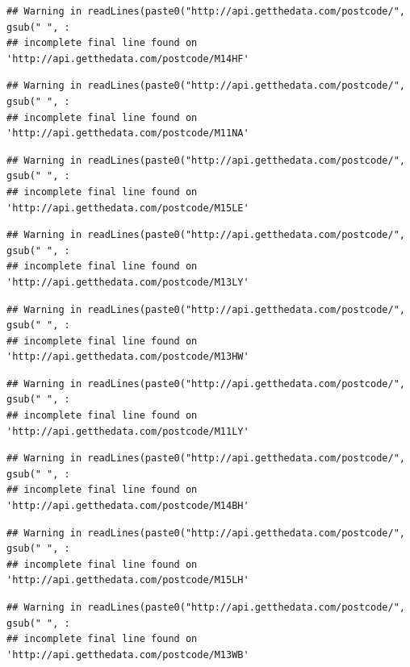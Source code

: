 \documentclass[]{book}
\begin{document}
\begin{verbatim}
## Warning in readLines(paste0("http://api.getthedata.com/postcode/", gsub(" ", :
## incomplete final line found on 'http://api.getthedata.com/postcode/M14HF'
\end{verbatim}

\begin{verbatim}
## Warning in readLines(paste0("http://api.getthedata.com/postcode/", gsub(" ", :
## incomplete final line found on 'http://api.getthedata.com/postcode/M11NA'
\end{verbatim}

\begin{verbatim}
## Warning in readLines(paste0("http://api.getthedata.com/postcode/", gsub(" ", :
## incomplete final line found on 'http://api.getthedata.com/postcode/M15LE'
\end{verbatim}

\begin{verbatim}
## Warning in readLines(paste0("http://api.getthedata.com/postcode/", gsub(" ", :
## incomplete final line found on 'http://api.getthedata.com/postcode/M13LY'
\end{verbatim}

\begin{verbatim}
## Warning in readLines(paste0("http://api.getthedata.com/postcode/", gsub(" ", :
## incomplete final line found on 'http://api.getthedata.com/postcode/M13HW'
\end{verbatim}

\begin{verbatim}
## Warning in readLines(paste0("http://api.getthedata.com/postcode/", gsub(" ", :
## incomplete final line found on 'http://api.getthedata.com/postcode/M11LY'
\end{verbatim}

\begin{verbatim}
## Warning in readLines(paste0("http://api.getthedata.com/postcode/", gsub(" ", :
## incomplete final line found on 'http://api.getthedata.com/postcode/M14BH'
\end{verbatim}

\begin{verbatim}
## Warning in readLines(paste0("http://api.getthedata.com/postcode/", gsub(" ", :
## incomplete final line found on 'http://api.getthedata.com/postcode/M15LH'
\end{verbatim}

\begin{verbatim}
## Warning in readLines(paste0("http://api.getthedata.com/postcode/", gsub(" ", :
## incomplete final line found on 'http://api.getthedata.com/postcode/M13WB'
\end{verbatim}
\end{document}
